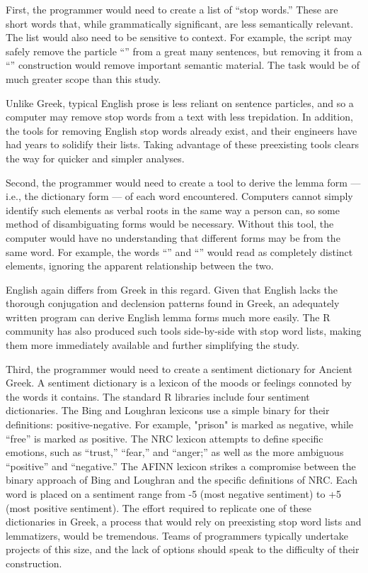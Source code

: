 \documentclass[noraggedright]{turabian-researchpaper}
\begin{document}
First, the programmer would need to create a list of ``stop words.'' These are
short words that, while grammatically significant, are less semantically
relevant. The list would also need to be sensitive to context. For example,
the script may safely remove the particle ``'' from a great many
sentences, but removing it from a  ``'' construction would
remove important semantic material. The task would be of much greater scope
than this study.

Unlike Greek, typical English prose is less reliant on sentence particles, and
so a computer may remove stop words from a text with less trepidation. In
addition, the tools for removing English stop words already exist, and their
engineers have had years to solidify their lists. Taking advantage of these
preexisting tools clears the way for quicker and simpler analyses.

Second, the programmer would need to create a tool to derive the lemma form —
i.e., the dictionary form — of each word encountered. Computers cannot simply
identify such elements as verbal roots in the same way a person can, so some
method of disambiguating forms would be necessary. Without this tool, the
computer would have no understanding that different forms may be from the
same word. For example, the words ``'' and ``''
would read as completely distinct elements, ignoring the apparent relationship
between the two.

English again differs from Greek in this regard. Given that English lacks the
thorough conjugation and declension patterns found in Greek, an adequately
written program can derive English lemma forms much more easily. The R
community has also produced such tools side-by-side with stop word lists, making
them more immediately available and further simplifying the study.

Third, the programmer would need to create a sentiment dictionary for Ancient
Greek. A sentiment dictionary is a lexicon of the moods or feelings connoted by
the words it contains. The standard R libraries include four sentiment
dictionaries. The Bing and Loughran lexicons use a simple binary for their
definitions: positive-negative. For example, "prison" is marked as negative,
while ``free'' is marked as positive. The NRC lexicon attempts to define
specific emotions, such as ``trust,'' ``fear,'' and ``anger;'' as well as the
more ambiguous ``positive'' and ``negative.'' The AFINN lexicon strikes a
compromise between the binary approach of Bing and Loughran and the specific
definitions of NRC. Each word is placed on a sentiment range from -5 (most
negative sentiment) to +5 (most positive sentiment). The effort required to
replicate one of these dictionaries in Greek, a process that would rely on
preexisting stop word lists and lemmatizers, would be tremendous. Teams of
programmers typically undertake projects of this size, and the lack of options
should speak to the difficulty of their construction. 
\end{document}
